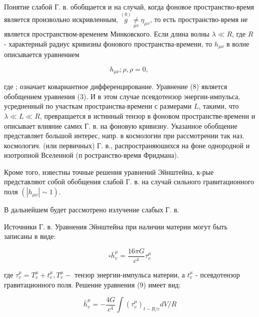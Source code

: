\documentclass[10pt]{article}
\begin{document}
Понятие слабой Г. в. обобщается и на случай, когда фоновое пространство-время является произвольно искривленным, $\stackrel{(0)}{g} \underset{\mu v}{\neq} \eta_{\mu v}$, то есть пространство-время не является пространством-временем Минковского. Если длина волны $\lambda \ll R$, где $R$ - характерный радиус кривизны фонового пространства-времени, то $h_{\mu \nu}$ в волне описывается уравнением



\[

h_{\mu \nu} ; \rho, \rho=0 \text {, }

\]



где ; означает ковариантное дифференцирование. Уравнение (8) является обобщением уравнения (3). И в этом случае псевдотензор энергии-импульса, усредненный по участкам пространства-времени с размерами $L$, такими, что $\lambda \ll L \ll R$, превращается в истинный тензор в фоновом пространстве-времени и описывает влияние самих Г. в. на фоновую кривизну. Указанное обобщение представляет большой интерес, напр. в космологии при рассмотрении так наз. космологич. (или первичных) Г. в., распространяюшихся на фоне однородной и изотропной Вселенной (п ространство-время Фридмана).



Кроме того, известны точные решения уравнений Эйнштейна, к-рые представляют собой обобщения слабой Г. в. на случай сильного гравитационного поля $\left(\left|h_{\mu \nu}\right| \sim 1\right)$.



В дальнейшем будет рассмотрено излучение слабых Г. в.



Источники Г. в. Уравнения Эйнштейна при наличии материи могут быть записаны в виде:



\[

\square \bar{h}_{v}^{\mu}=\frac{16 \pi G}{c^{4}} \tau_{v}^{\mu}

\]



где $\tau_{v}^{\mu}=T_{v}^{\mu}+t_{v}^{\mu}, T_{v}^{\mu}-$ тензор энергии-импульса материи, а $t_{v}^{\mu}$ - псевдотензор гравитационного поля. Решение уравнения (9) имеет вид:



\[

\bar{h}_{v}^{\mu}=-\frac{4 G}{c^{4}} \int\left(\tau_{v}^{\mu}\right)_{t-R / c} d V / R

\]
\end{document}
